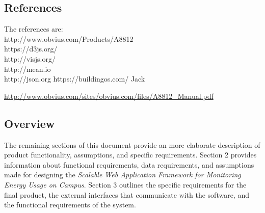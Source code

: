 \documentclass[onecolumn, draftclsnofoot,10pt, compsoc]{IEEEtran}
\begin{document}
    \subsection{References} 
	The references are:\\
	http://www.obvius.com/Products/A8812 \\
    https://d3js.org/  \\
    http://visjs.org/  \\
    http://mean.io  \\
	http://json.org
	https://buildingos.com/
	Jack
	
    \url{http://www.obvius.com/sites/obvius.com/files/A8812_Manual.pdf}

    \subsection{Overview}
	The remaining sections of this document provide an more elaborate description of product functionality, assumptions, and specific requirements. Section 2 provides information about functional requirements, data requirements, and assumptions made for designing the \textit{Scalable Web Application Framework for Monitoring Energy Usage on Campus}. Section 3 outlines the specific requirements for the final product, the external interfaces that communicate with the software, and the functional requirements of the system.
	
\end{document}
